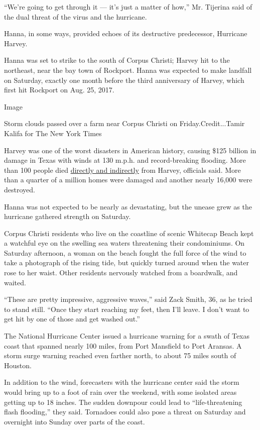 ``We're going to get through it --- it's just a matter of how,'' Mr.
Tijerina said of the dual threat of the virus and the hurricane.

Hanna, in some ways, provided echoes of its destructive predecessor,
Hurricane Harvey.

Hanna was set to strike to the south of Corpus Christi; Harvey hit to
the northeast, near the bay town of Rockport. Hanna was expected to make
landfall on Saturday, exactly one month before the third anniversary of
Harvey, which first hit Rockport on Aug. 25, 2017.

Image

Storm clouds passed over a farm near Corpus Christi on
Friday.Credit...Tamir Kalifa for The New York Times

Harvey was one of the worst disasters in American history, causing \$125
billion in damage in Texas with winds at 130 m.p.h. and record-breaking
flooding. More than 100 people died
\href{https://www.nhc.noaa.gov/data/tcr/AL092017_Harvey.pdf}{directly
and indirectly} from Harvey, officials said. More than a quarter of a
million homes were damaged and another nearly 16,000 were destroyed.

Hanna was not expected to be nearly as devastating, but the unease grew
as the hurricane gathered strength on Saturday.

Corpus Christi residents who live on the coastline of scenic Whitecap
Beach kept a watchful eye on the swelling sea waters threatening their
condominiums. On Saturday afternoon, a woman on the beach fought the
full force of the wind to take a photograph of the rising tide, but
quickly turned around when the water rose to her waist. Other residents
nervously watched from a boardwalk, and waited.

``These are pretty impressive, aggressive waves,'' said Zack Smith, 36,
as he tried to stand still. ``Once they start reaching my feet, then
I'll leave. I don't want to get hit by one of those and get washed
out.''

The National Hurricane Center issued a hurricane warning for a swath of
Texas coast that spanned nearly 100 miles, from Port Mansfield to Port
Aransas. A storm surge warning reached even farther north, to about 75
miles south of Houston.

In addition to the wind, forecasters with the hurricane center said the
storm would bring up to a foot of rain over the weekend, with some
isolated areas getting up to 18 inches. The sudden downpour could lead
to ``life-threatening flash flooding,'' they said. Tornadoes could also
pose a threat on Saturday and overnight into Sunday over parts of the
coast.

